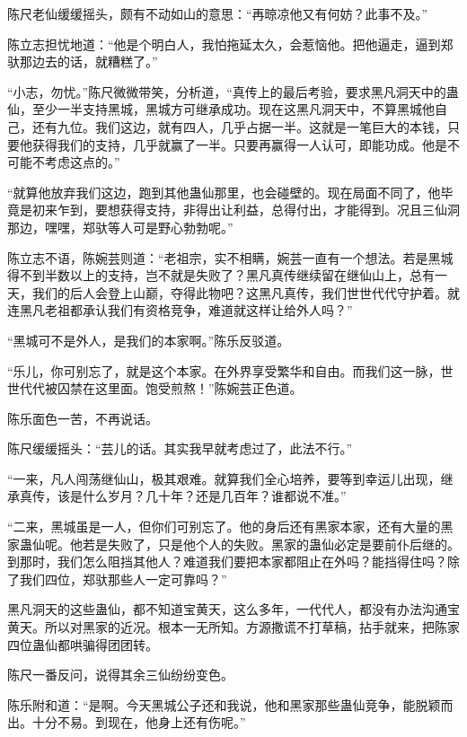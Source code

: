 
\begin{this_body}



陈尺老仙缓缓摇头，颇有不动如山的意思：“再晾凉他又有何妨？此事不及。”

陈立志担忧地道：“他是个明白人，我怕拖延太久，会惹恼他。把他逼走，逼到郑驮那边去的话，就糟糕了。”

“小志，勿忧。”陈尺微微带笑，分析道，“真传上的最后考验，要求黑凡洞天中的蛊仙，至少一半支持黑城，黑城方可继承成功。现在这黑凡洞天中，不算黑城他自己，还有九位。我们这边，就有四人，几乎占据一半。这就是一笔巨大的本钱，只要他获得我们的支持，几乎就赢了一半。只要再赢得一人认可，即能功成。他是不可能不考虑这点的。”

“就算他放弃我们这边，跑到其他蛊仙那里，也会碰壁的。现在局面不同了，他毕竟是初来乍到，要想获得支持，非得出让利益，总得付出，才能得到。况且三仙洞那边，嘿嘿，郑驮等人可是野心勃勃呢。”

陈立志不语，陈婉芸则道：“老祖宗，实不相瞒，婉芸一直有一个想法。若是黑城得不到半数以上的支持，岂不就是失败了？黑凡真传继续留在继仙山上，总有一天，我们的后人会登上山巅，夺得此物吧？这黑凡真传，我们世世代代守护着。就连黑凡老祖都承认我们有资格竞争，难道就这样让给外人吗？”

“黑城可不是外人，是我们的本家啊。”陈乐反驳道。

“乐儿，你可别忘了，就是这个本家。在外界享受繁华和自由。而我们这一脉，世世代代被囚禁在这里面。饱受煎熬！”陈婉芸正色道。

陈乐面色一苦，不再说话。

陈尺缓缓摇头：“芸儿的话。其实我早就考虑过了，此法不行。”

“一来，凡人闯荡继仙山，极其艰难。就算我们全心培养，要等到幸运儿出现，继承真传，该是什么岁月？几十年？还是几百年？谁都说不准。”

“二来，黑城虽是一人，但你们可别忘了。他的身后还有黑家本家，还有大量的黑家蛊仙呢。他若是失败了，只是他个人的失败。黑家的蛊仙必定是要前仆后继的。到那时，我们怎么阻挡其他人？难道我们要把本家都阻止在外吗？能挡得住吗？除了我们四位，郑驮那些人一定可靠吗？”

黑凡洞天的这些蛊仙，都不知道宝黄天，这么多年，一代代人，都没有办法沟通宝黄天。所以对黑家的近况。根本一无所知。方源撒谎不打草稿，拈手就来，把陈家四位蛊仙都哄骗得团团转。

陈尺一番反问，说得其余三仙纷纷变色。

陈乐附和道：“是啊。今天黑城公子还和我说，他和黑家那些蛊仙竞争，能脱颖而出。十分不易。到现在，他身上还有伤呢。”


\end{this_body}
